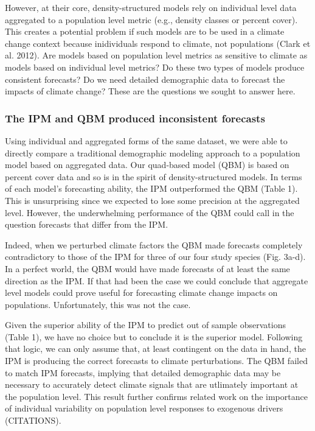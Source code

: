 \documentclass[12pt,]{article}
\begin{document}
However, at their core, density-structured models rely on individual
level data aggregated to a population level metric (e.g., density
classes or percent cover). This creates a potential problem if such
models are to be used in a climate change context because inidividuals
respond to climate, not populations (Clark et al. 2012). Are models
based on population level metrics as sensitive to climate as models
based on individual level metrics? Do these two types of models produce
consistent forecasts? Do we need detailed demographic data to forecast
the impacts of climate change? These are the questions we sought to
answer here.

\subsubsection{The IPM and QBM produced inconsistent
forecasts}\label{the-ipm-and-qbm-produced-inconsistent-forecasts}

Using individual and aggregated forms of the same dataset, we were able
to directly compare a traditional demographic modeling approach to a
population model based on aggregated data. Our quad-based model (QBM) is
based on percent cover data and so is in the spirit of
density-structured models. In terms of each model's forecasting ability,
the IPM outperformed the QBM (Table 1). This is unsurprising since we
expected to lose some precision at the aggregated level. However, the
underwhelming performance of the QBM could call in the question
forecasts that differ from the IPM.

Indeed, when we perturbed climate factors the QBM made forecasts
completely contradictory to those of the IPM for three of our four study
species (Fig. 3a-d). In a perfect world, the QBM would have made
forecasts of at least the same direction as the IPM. If that had been
the case we could conclude that aggregate level models could prove
useful for forecasting climate change impacts on populations.
Unfortunately, this was not the case.

Given the superior ability of the IPM to predict out of sample
observations (Table 1), we have no choice but to conclude it is the
superior model. Following that logic, we can only assume that, at least
contingent on the data in hand, the IPM is producing the correct
forecasts to climate perturbations. The QBM failed to match IPM
forecasts, implying that detailed demographic data may be necessary to
accurately detect climate signals that are utlimately important at the
population level. This result further confirms related work on the
importance of individual variability on population level responses to
exogenous drivers (CITATIONS).
\end{document}
